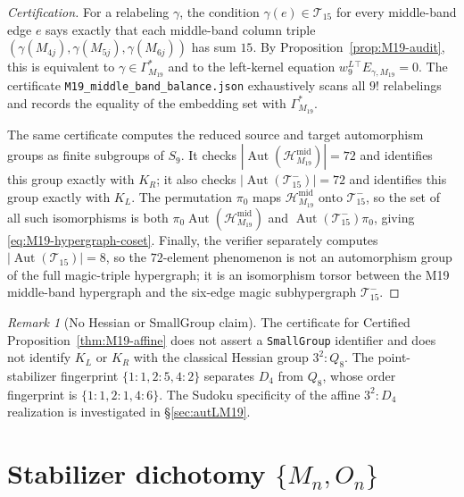 \documentclass[11pt,a4paper]{article}
\theoremstyle{definition}
\theoremstyle{remark}
\newtheorem{remark}[theorem]{Remark}
\providecommand{\Aut}{\operatorname{Aut}}
\newcommand{\GMninetn}{\Gamma^{*}_{M_{19}}}     %
\newcommand{\wleftnine}{w^{L}_{9}}
\newcommand{\KL}{K_L}
\newcommand{\KR}{K_R}
\begin{document}
\begin{proof}[Certification]
For a relabeling $\gamma$, the condition
$\gamma(e)\in\mathcal T_{15}$ for every middle-band edge $e$ says
exactly that each middle-band column triple
$(\gamma(M_{4j}),\gamma(M_{5j}),\gamma(M_{6j}))$ has sum $15$.
By Proposition~\ref{prop:M19-audit}, this is equivalent to
$\gamma\in\GMninetn$ and to the left-kernel equation
$\wleftnine{}^{\!\top}E_{\gamma,M_{19}}=0$. The certificate
\texttt{M19\_middle\_band\_balance.json} exhaustively scans all
$9!$ relabelings and records the equality of the embedding set with
$\GMninetn$.

The same certificate computes the reduced source and target
automorphism groups as finite subgroups of $S_9$. It checks
$|\Aut(\mathcal H_{M_{19}}^{\mathrm{mid}})|=72$ and identifies this
group exactly with $\KR$; it also checks
$|\Aut(\mathcal T^-_{15})|=72$ and identifies this group exactly with
$\KL$. The permutation $\pi_0$ maps
$\mathcal H_{M_{19}}^{\mathrm{mid}}$ onto $\mathcal T^-_{15}$, so the
set of all such isomorphisms is both
$\pi_0\Aut(\mathcal H_{M_{19}}^{\mathrm{mid}})$ and
$\Aut(\mathcal T^-_{15})\pi_0$, giving
\eqref{eq:M19-hypergraph-coset}. Finally, the verifier separately
computes $|\Aut(\mathcal T_{15})|=8$, so the $72$-element phenomenon is
not an automorphism group of the full magic-triple hypergraph; it is an
isomorphism torsor between the M19 middle-band hypergraph and the
six-edge magic subhypergraph $\mathcal T^-_{15}$.
\end{proof}

\begin{remark}[No Hessian or SmallGroup claim]\label{rem:hessian-context}
The certificate for Certified Proposition~\ref{thm:M19-affine} does not assert a
\texttt{SmallGroup} identifier and does not identify $\KL$ or $\KR$
with the classical Hessian group $3^2{:}Q_8$. The point-stabilizer
fingerprint $\{1\!:\!1,2\!:\!5,4\!:\!2\}$ separates $D_4$ from
$Q_8$, whose order fingerprint is $\{1\!:\!1,2\!:\!1,4\!:\!6\}$.
The Sudoku specificity of the affine $3^2{:}D_4$ realization is
investigated in \S\ref{sec:autLM19}.
\end{remark}

\section{\texorpdfstring{Stabilizer dichotomy $\{M_n, O_n\}$}{Stabilizer dichotomy Mn/On}}\label{sec:dichotomy}
\end{document}
